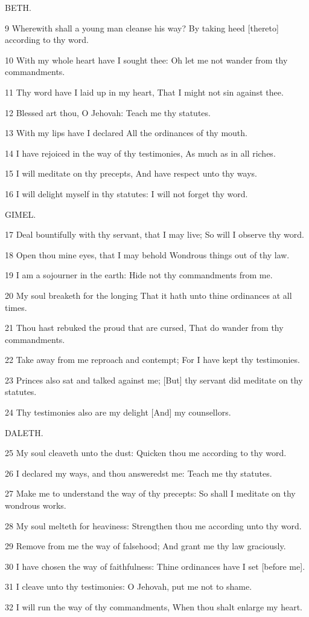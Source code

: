 \par BETH.

\par 9 Wherewith shall a young man cleanse his way? By taking heed [thereto] according to thy word.
\par 10 With my whole heart have I sought thee: Oh let me not wander from thy commandments.
\par 11 Thy word have I laid up in my heart, That I might not sin against thee.
\par 12 Blessed art thou, O Jehovah: Teach me thy statutes.
\par 13 With my lips have I declared All the ordinances of thy mouth.
\par 14 I have rejoiced in the way of thy testimonies, As much as in all riches.
\par 15 I will meditate on thy precepts, And have respect unto thy ways.
\par 16 I will delight myself in thy statutes: I will not forget thy word.

\par GIMEL.

\par 17 Deal bountifully with thy servant, that I may live; So will I observe thy word.
\par 18 Open thou mine eyes, that I may behold Wondrous things out of thy law.
\par 19 I am a sojourner in the earth: Hide not thy commandments from me.
\par 20 My soul breaketh for the longing That it hath unto thine ordinances at all times.
\par 21 Thou hast rebuked the proud that are cursed, That do wander from thy commandments.
\par 22 Take away from me reproach and contempt; For I have kept thy testimonies.
\par 23 Princes also sat and talked against me; [But] thy servant did meditate on thy statutes.
\par 24 Thy testimonies also are my delight [And] my counsellors.

\par DALETH.

\par 25 My soul cleaveth unto the dust: Quicken thou me according to thy word.
\par 26 I declared my ways, and thou answeredst me: Teach me thy statutes.
\par 27 Make me to understand the way of thy precepts: So shall I meditate on thy wondrous works.
\par 28 My soul melteth for heaviness: Strengthen thou me according unto thy word.
\par 29 Remove from me the way of falsehood; And grant me thy law graciously.
\par 30 I have chosen the way of faithfulness: Thine ordinances have I set [before me].
\par 31 I cleave unto thy testimonies: O Jehovah, put me not to shame.
\par 32 I will run the way of thy commandments, When thou shalt enlarge my heart.

